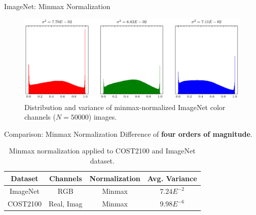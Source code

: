 \documentclass{beamer}
\begin{document}
    \begin{frame}{ImageNet: Minmax Normalization}
      \begin{figure}[htb]
        \centering
        \includegraphics[width=.9\textwidth]{imagenet_rgb_dist.pdf}
        \medskip
        \caption{Distribution and variance of minmax-normalized ImageNet color channels ($N=50000$) images.}
        \label{fig:imagenet_dist}
      \end{figure}
    \end{frame}

    \begin{frame}{Comparison: Minmax Normalization}
      Difference of \textbf{four orders of magnitude}. \\
      \begin{table}[htb]
        \begin{center}
          \begin{tabular}{|c|c|c|c|}
          \hline
          \textbf{Dataset} & \textbf{Channels} & \textbf{Normalization} & \textbf{Avg. Variance} \\ \hline
          ImageNet       & RGB                 & Minmax                 & \underline{$7.24E^{-2}$}       \\ \hline
          COST2100       & Real, Imag          & Minmax                 & \underline{$9.98E^{-6}$}       \\ \hline
          \end{tabular}
          \caption{Minmax normalization applied to COST2100 and ImageNet dataset.}
          \label{tab:minmax-compare} 
        \end{center}
      \end{table}
    \end{frame}
\end{document}
